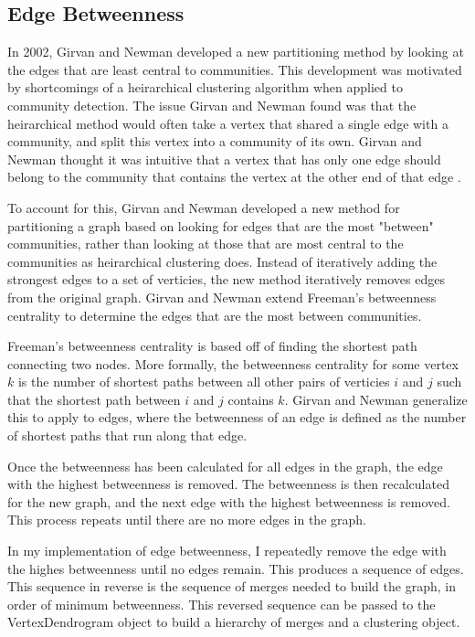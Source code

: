 \documentclass{article}
\begin{document}
    \subsection{Edge Betweenness}
    In 2002, Girvan and Newman developed a new partitioning method by looking at the edges that are least central to communities. This development was motivated by shortcomings of a heirarchical clustering algorithm when applied to community detection. The issue Girvan and Newman found was that the heirarchical method would often take a vertex that shared a single edge with a community, and split this vertex into a community of its own. Girvan and Newman thought it was intuitive that a vertex that has only one edge should belong to the community that contains the vertex at the other end of that edge \cite{Girvan7821}.
    \par
    To account for this, Girvan and Newman developed a new method for partitioning a graph based on looking for edges that are the most "between" communities, rather than looking at those that are most central to the communities as heirarchical clustering does. Instead of iteratively adding the strongest edges to a set of verticies, the new method iteratively removes edges from the original graph. Girvan and Newman extend Freeman's betweenness centrality to determine the edges that are the most between communities.
    \par
    Freeman's betweenness centrality is based off of finding the shortest path connecting two nodes. More formally, the betweenness centrality for some vertex $k$ is the number of shortest paths between all other pairs of verticies $i$ and $j$ such that the shortest path between $i$ and $j$ contains $k$. Girvan and Newman generalize this to apply to edges, where the betweenness of an edge is defined as the number of shortest paths that run along that edge.
    \par
    Once the betweenness has been calculated for all edges in the graph, the edge with the highest betweenness is removed. The betweenness is then recalculated for the new graph, and the next edge with the highest betweenness is removed. This process repeats until there are no more edges in the graph.
    \par
    In my implementation of edge betweenness, I repeatedly remove the edge with the highes betweenness until no edges remain. This produces a sequence of edges. This sequence in reverse is the sequence of merges needed to build the graph, in order of minimum betweenness. This reversed sequence can be passed to the VertexDendrogram object to build a hierarchy of merges and a clustering object.
\end{document}
